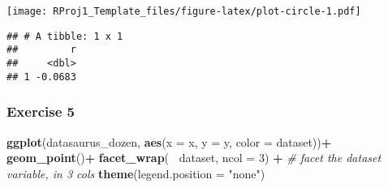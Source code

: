 \documentclass[
]{article}
\newenvironment{Shaded}{\begin{snugshade}}{\end{snugshade}}
\newcommand{\CommentTok}[1]{\textcolor[rgb]{0.56,0.35,0.01}{\textit{#1}}}
\newcommand{\DataTypeTok}[1]{\textcolor[rgb]{0.13,0.29,0.53}{#1}}
\newcommand{\DecValTok}[1]{\textcolor[rgb]{0.00,0.00,0.81}{#1}}
\newcommand{\KeywordTok}[1]{\textcolor[rgb]{0.13,0.29,0.53}{\textbf{#1}}}
\newcommand{\NormalTok}[1]{#1}
\newcommand{\OperatorTok}[1]{\textcolor[rgb]{0.81,0.36,0.00}{\textbf{#1}}}
\newcommand{\StringTok}[1]{\textcolor[rgb]{0.31,0.60,0.02}{#1}}
\begin{document}
\begin{Shaded}
\end{Shaded}

\texttt{[image: RProj1\_Template\_files/figure-latex/plot-circle-1.pdf]}

\begin{Shaded}
\end{Shaded}

\begin{verbatim}
## # A tibble: 1 x 1
##         r
##     <dbl>
## 1 -0.0683
\end{verbatim}

\hypertarget{exercise-5}{%
\subsubsection{Exercise 5}\label{exercise-5}}

\begin{Shaded}
\begin{Highlighting}[]
  \KeywordTok{ggplot}\NormalTok{(datasaurus_dozen, }\KeywordTok{aes}\NormalTok{(}\DataTypeTok{x =}\NormalTok{ x, }\DataTypeTok{y =}\NormalTok{ y, }\DataTypeTok{color =}\NormalTok{ dataset))}\OperatorTok{+}
\StringTok{  }\KeywordTok{geom_point}\NormalTok{()}\OperatorTok{+}
\StringTok{  }\KeywordTok{facet_wrap}\NormalTok{(}\OperatorTok{~}\StringTok{ }\NormalTok{dataset, }\DataTypeTok{ncol =} \DecValTok{3}\NormalTok{) }\OperatorTok{+}\StringTok{ }\CommentTok{# facet the dataset variable, in 3 cols}
\StringTok{  }\KeywordTok{theme}\NormalTok{(}\DataTypeTok{legend.position =} \StringTok{"none"}\NormalTok{)}
\end{Highlighting}
\end{Shaded}
\end{document}
